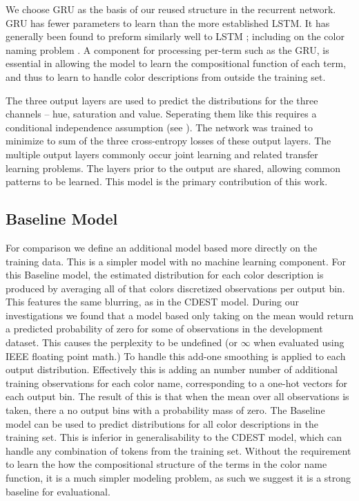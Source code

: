 \documentclass[11pt,letterpaper]{article}
\newcommand{\parencite}{\cite}
\begin{document}
We choose GRU as the basis of our reused structure in the recurrent network.
GRU has fewer parameters to learn than the more established LSTM.
It has generally been found to preform similarly well to LSTM \parencite{chung2014empirical};
including on the color naming problem \parencite{2016arXiv160603821M}.
A component for processing per-term such as the GRU, is essential in allowing the model to learn the compositional function of each term,  and thus to learn to handle color descriptions from outside the training set.

The three output layers are used to predict the distributions for the three channels -- hue, saturation and value.
Seperating them like this requires a conditional independence assumption (see ).
The network was trained to minimize to sum of the three cross-entropy losses of these output layers.
The multiple output layers commonly occur joint learning and related transfer learning problems.
The layers prior to the output are shared, allowing common patterns to be learned.
This model is the primary contribution of this work.


\subsection{Baseline Model}
For comparison we define an additional model based more directly on the training data.
This is a simpler model with no machine learning component.
For this Baseline model, the estimated distribution for each color description is produced by averaging all of that colors discretized observations per output bin.
This features the same blurring, as in the CDEST model.
During our investigations we found that a model based only taking on the mean would return a predicted probability of zero for some of observations in the development dataset.
This causes the perplexity to be undefined (or $\infty$ when evaluated using IEEE floating point math.)
To handle this add-one smoothing is applied to each output distribution.
Effectively this is adding an number number of additional training observations for each color name,
corresponding to a one-hot vectors for each output bin.
The result of this is that when the mean over all observations is taken, there a no output bins with a probability mass of zero.
The Baseline model can be used to predict distributions for all color descriptions in the training set.
This is inferior in generalisability to the CDEST model, which can handle any combination of tokens from the training set.
Without the requirement to learn the how the compositional structure of the terms in the color name function, it is a much simpler modeling problem, as such we suggest it is a strong baseline for evaluational.
\end{document}
